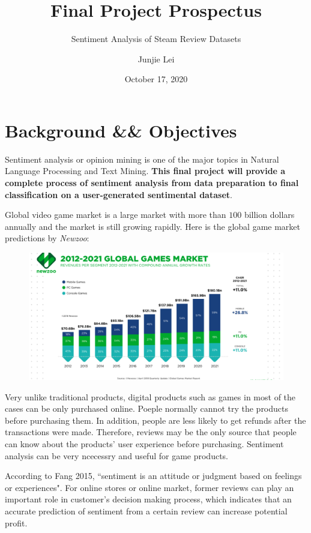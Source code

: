\documentclass[11pt]{scrartcl}
\title{Final Project Prospectus}
\subtitle{{Sentiment Analysis of Steam Review Datasets}}
\author{Junjie Lei}
\date{October 17, 2020}
\begin{document}
\maketitle

\section*{Background \&\& Objectives}
Sentiment analysis or opinion mining is one of the major topics in Natural Language Processing and Text Mining. \textbf{This final project will provide a complete process of sentiment analysis from data preparation to final classification on a user-generated sentimental dataset}.

Global video game market is a large market with more than $100$ billion dollars annually and the market is still growing rapidly. Here is the global game market predictions by \textit{Newzoo}: 

\begin{figure}[!ht]
\includegraphics{prediction.png}
\centering
\end{figure}

Very unlike traditional products, digital products such as games in most of the cases can be only purchased online. Poeple normally cannot try the products before purchasing them. In addition, people are less likely to get refunds after the transactions were made. Therefore, reviews may be the only source that people can know about the products' user experience before purchasing. Sentiment analysis can be very ncecessry and useful for game products. 

According to Fang 2015, ``sentiment is an attitude or judgment based on feelings or experiences". For online stores or online market, former reviews can play an important role in customer’s decision making process, which indicates that an accurate prediction of sentiment from a certain review can increase potential profit.
\end{document}
